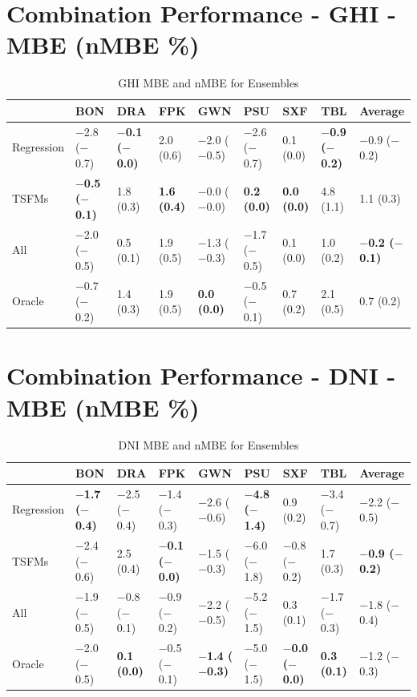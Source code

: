 \section*{Combination Performance - GHI - MBE (nMBE \%)}
\begin{table}
\caption{GHI MBE and nMBE for Ensembles}
\begin{tabular}{lllllllll}
\toprule
 & BON & DRA & FPK & GWN & PSU & SXF & TBL & Average \\
\midrule
Regression & $-$2.8 ($-$0.7) & \textbf{$-$0.1 ($-$0.0)} & 2.0 (0.6) & $-$2.0 ($-$0.5) & $-$2.6 ($-$0.7) & 0.1 (0.0) & \textbf{$-$0.9 ($-$0.2)} & $-$0.9 ($-$0.2) \\
TSFMs & \textbf{$-$0.5 ($-$0.1)} & 1.8 (0.3) & \textbf{1.6 (0.4)} & $-$0.0 ($-$0.0) & \textbf{0.2 (0.0)} & \textbf{0.0 (0.0)} & 4.8 (1.1) & 1.1 (0.3) \\
All & $-$2.0 ($-$0.5) & 0.5 (0.1) & 1.9 (0.5) & $-$1.3 ($-$0.3) & $-$1.7 ($-$0.5) & 0.1 (0.0) & 1.0 (0.2) & \textbf{$-$0.2 ($-$0.1)} \\
Oracle & $-$0.7 ($-$0.2) & 1.4 (0.3) & 1.9 (0.5) & \textbf{0.0 (0.0)} & $-$0.5 ($-$0.1) & 0.7 (0.2) & 2.1 (0.5) & 0.7 (0.2) \\
\bottomrule
\end{tabular}
\end{table}

\vspace{1cm}

\section*{Combination Performance - DNI - MBE (nMBE \%)}
\begin{table}
\caption{DNI MBE and nMBE for Ensembles}
\begin{tabular}{lllllllll}
\toprule
 & BON & DRA & FPK & GWN & PSU & SXF & TBL & Average \\
\midrule
Regression & \textbf{$-$1.7 ($-$0.4)} & $-$2.5 ($-$0.4) & $-$1.4 ($-$0.3) & $-$2.6 ($-$0.6) & \textbf{$-$4.8 ($-$1.4)} & 0.9 (0.2) & $-$3.4 ($-$0.7) & $-$2.2 ($-$0.5) \\
TSFMs & $-$2.4 ($-$0.6) & 2.5 (0.4) & \textbf{$-$0.1 ($-$0.0)} & $-$1.5 ($-$0.3) & $-$6.0 ($-$1.8) & $-$0.8 ($-$0.2) & 1.7 (0.3) & \textbf{$-$0.9 ($-$0.2)} \\
All & $-$1.9 ($-$0.5) & $-$0.8 ($-$0.1) & $-$0.9 ($-$0.2) & $-$2.2 ($-$0.5) & $-$5.2 ($-$1.5) & 0.3 (0.1) & $-$1.7 ($-$0.3) & $-$1.8 ($-$0.4) \\
Oracle & $-$2.0 ($-$0.5) & \textbf{0.1 (0.0)} & $-$0.5 ($-$0.1) & \textbf{$-$1.4 ($-$0.3)} & $-$5.0 ($-$1.5) & \textbf{$-$0.0 ($-$0.0)} & \textbf{0.3 (0.1)} & $-$1.2 ($-$0.3) \\
\bottomrule
\end{tabular}
\end{table}

\vspace{1cm}

